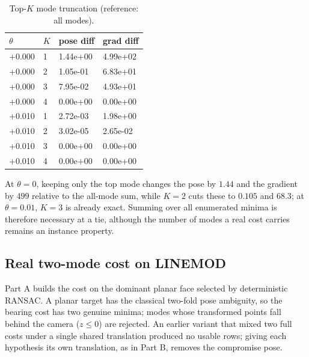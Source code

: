 \begin{table}[t]
\centering
\caption{Top-$K$ mode truncation (reference: all modes).}
\label{tab:topk}
\footnotesize
\setlength{\tabcolsep}{4pt}
\begin{tabular}{@{}l l l l@{}}
\toprule
$\theta$ & $K$ & pose diff & grad diff\\
\midrule
+0.000 & 1 & 1.44e+00 & 4.99e+02\\
+0.000 & 2 & 1.05e-01 & 6.83e+01\\
+0.000 & 3 & 7.95e-02 & 4.93e+01\\
+0.000 & 4 & 0.00e+00 & 0.00e+00\\
+0.010 & 1 & 2.72e-03 & 1.98e+00\\
+0.010 & 2 & 3.02e-05 & 2.65e-02\\
+0.010 & 3 & 0.00e+00 & 0.00e+00\\
+0.010 & 4 & 0.00e+00 & 0.00e+00\\
\bottomrule
\end{tabular}
\end{table}

At $\theta=0$, keeping only the top mode changes the pose by $1.44$ and the gradient by $499$ relative to the all-mode sum, while $K=2$ cuts these to $0.105$ and $68.3$; at $\theta=0.01$, $K=3$ is already exact. Summing over all enumerated minima is therefore necessary at a tie, although the number of modes a real cost carries remains an instance property.

\subsection{Real two-mode cost on LINEMOD}\label{sec:real}

Part A builds the cost on the dominant planar face selected by deterministic RANSAC. A planar target has the classical two-fold pose ambiguity, so the bearing cost has two genuine minima; modes whose transformed points fall behind the camera ($z\le0$) are rejected. An earlier variant that mixed two full costs under a single shared translation produced no usable rows; giving each hypothesis its own translation, as in Part B, removes the compromise pose.

